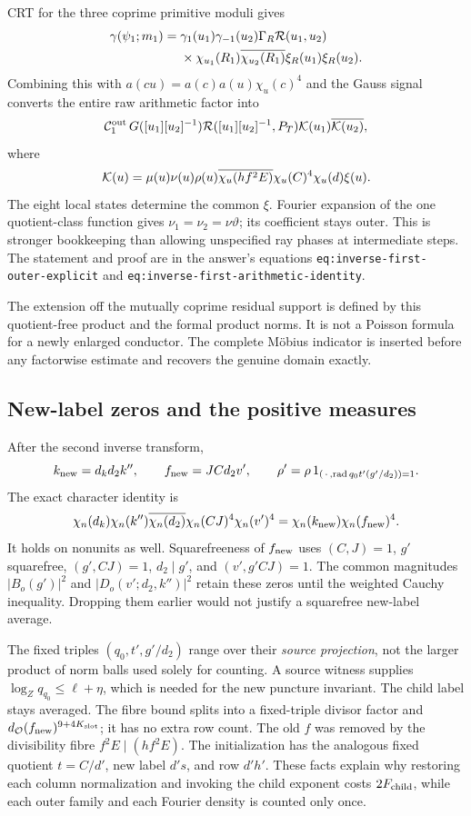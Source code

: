\documentclass[12pt]{article}
\begin{document}
CRT for the three coprime primitive moduli gives
\[
\begin{split}
 \gamma(\psi_1;m_1)
 ={}&\gamma_1(u_1)\gamma_{-1}(u_2)\Gamma_R{\cal R}(u_1,u_2)\\
 &\times\chi_{u_1}(R_1)\overline{\chi_{u_2}(R_1)}
                     \xi_R(u_1)\xi_R(u_2).
\end{split}
\]
Combining this with
\(a(cu)=a(c)a(u)\chi_u(c)^4\) and the Gauss signal converts the
entire raw arithmetic factor into
\[
 {\cal C}^{\rm out}_1\,
  G([u_1][u_2]^{-1}){\cal R}([u_1][u_2]^{-1},P_T)
  {\cal K}(u_1)\overline{{\cal K}(u_2)},
\]
where
\[
 {\cal K}(u)=\mu(u)\nu(u)\rho(u)
       \overline{\chi_u(hf^2E)}\chi_u(C)^4\chi_u(d)\xi(u).
\]
The eight local states determine the common \(\xi\).
Fourier expansion of the one quotient-class function gives
\(\nu_1=\nu_2=\nu\vartheta\); its coefficient stays outer.
This is stronger bookkeeping than allowing unspecified ray phases
at intermediate steps.  The statement and proof are in the answer's
equations \texttt{eq:inverse-first-outer-explicit} and
\texttt{eq:inverse-first-arithmetic-identity}.

The extension off the mutually coprime residual support is defined
by this quotient-free product and the formal product norms.
It is not a Poisson formula for a newly enlarged conductor.
The complete M\"obius indicator is inserted before any factorwise
estimate and recovers the genuine domain exactly.

\subsection{New-label zeros and the positive measures}
After the second inverse transform,
\[
 k_{\rm new}=d_kd_2k'',\qquad f_{\rm new}=JCd_2v',\qquad
 \rho'=\rho\,1_{(\,\cdot\,,\operatorname{rad}q_0t'(g'/d_2))=1}.
\]
The exact character identity is
\[
 \chi_n(d_k)\chi_n(k'')\overline{\chi_n(d_2)}
       \chi_n(CJ)^4\chi_n(v')^4
 =\chi_n(k_{\rm new})\chi_n(f_{\rm new})^4 .
\]
It holds on nonunits as well.  Squarefreeness of \(f_{\rm new}\)
uses \((C,J)=1\), \(g'\) squarefree,
\((g',CJ)=1\), \(d_2\mid g'\), and
\((v',g'CJ)=1\).  The common magnitudes \(|B_o(g')|^2\) and
\(|D_o(v';d_2,k'')|^2\) retain these zeros until the weighted
Cauchy inequality.  Dropping them earlier would not justify a
squarefree new-label average.

The fixed triples \((q_0,t',g'/d_2)\) range over their
\emph{source projection}, not the larger product of norm balls
used solely for counting.  A source witness supplies
\(\log_Zq_{q_0}\le\ell+\eta\), which is needed for the
new puncture invariant.  The child label stays averaged.
The fibre bound splits into a fixed-triple divisor factor and
\(d_{\mathcal O}(f_{\rm new})^{9+4K_{\rm slot}}\);
it has no extra row count.  The old \(f\) was removed by the
divisibility fibre \(f^2E\mid(hf^2E)\).
The initialization has the analogous fixed quotient \(t=C/d'\),
new label \(d's\), and row \(d'h'\).
These facts explain why restoring each column normalization and
invoking the child exponent costs \(2F_{\rm child}\), while each
outer family and each Fourier density is counted only once.
\end{document}

